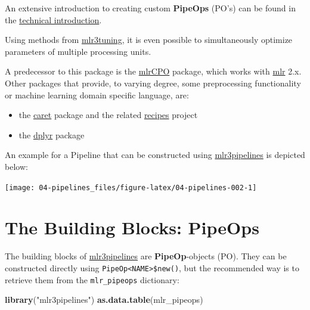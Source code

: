 \documentclass[]{scrbook}
\newenvironment{Shaded}{\begin{snugshade}}{\end{snugshade}}
\newcommand{\KeywordTok}[1]{\textcolor[rgb]{0.13,0.29,0.53}{\textbf{#1}}}
\newcommand{\NormalTok}[1]{#1}
\newcommand{\StringTok}[1]{\textcolor[rgb]{0.31,0.60,0.02}{#1}}
\providecommand{\tightlist}{%
  \setlength{\itemsep}{0pt}\setlength{\parskip}{0pt}}
\renewenvironment{Shaded} {\begin{snugshade}\small} {\end{snugshade}}
\begin{document}
An extensive introduction to creating custom \textbf{PipeOps} (PO's) can be found in the \protect\hyperlink{extending-mlr3pipelines}{technical introduction}.

Using methods from \href{https://mlr3tuning.mlr-org.com}{mlr3tuning}, it is even possible to simultaneously optimize parameters of multiple processing units.

A predecessor to this package is the \href{https://cran.r-project.org/package=mlrCPO}{mlrCPO} package, which works with \href{https://cran.r-project.org/package=mlr}{mlr} 2.x.
Other packages that provide, to varying degree, some preprocessing functionality or machine learning domain specific language, are:

\begin{itemize}
\tightlist
\item
  the \href{https://cran.r-project.org/package=caret}{caret} package and the related \href{https://cran.r-project.org/package=recipes}{recipes} project
\item
  the \href{https://cran.r-project.org/package=dplyr}{dplyr} package
\end{itemize}

An example for a Pipeline that can be constructed using \href{https://mlr3pipelines.mlr-org.com}{mlr3pipelines} is depicted below:

\begin{center}\texttt{[image: 04-pipelines\_files/figure-latex/04-pipelines-002-1]} \end{center}

\hypertarget{pipe-pipeops}{%
\section{The Building Blocks: PipeOps}\label{pipe-pipeops}}

The building blocks of \href{https://mlr3pipelines.mlr-org.com}{mlr3pipelines} are \textbf{PipeOp}-objects (PO).
They can be constructed directly using \texttt{PipeOp\textless{}NAME\textgreater{}\$new()}, but the recommended way is to retrieve them from the \texttt{mlr\_pipeops} dictionary:

\begin{Shaded}
\begin{Highlighting}[]
\KeywordTok{library}\NormalTok{(}\StringTok{"mlr3pipelines"}\NormalTok{)}
\KeywordTok{as.data.table}\NormalTok{(mlr_pipeops)}
\end{Highlighting}
\end{Shaded}
\end{document}
